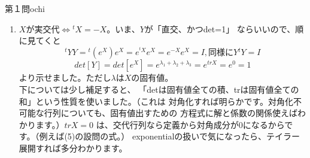 \begin{answer}{第１問}{ochi}
\begin{enumerate}
\item
  $X$が実交代$\Leftrightarrow {}^tX=-X$。いま、$Y$が「直交、かつdet=1」
  ならいいので、順に見てくと
  \begin{equation}
  {}^tYY={}^t(e^X)e^X=e^{{}^tX}e^X=e^{-X}e^X=I,　同様にY{}^tY=I
  \end{equation}
  \begin{equation}
  det[Y]=det [e^X]=e^{\lambda_1+\lambda_2+\lambda_3}=e^{tr X}=e^0=1
  \end{equation}
  より示せました。ただし$\lambda$は$X$の固有値。\\

  下については少し補足すると、
  「detは固有値全ての積、trは固有値全ての和」という性質を使いました。（これは
  対角化すれば明らかです。対角化不可能な行列についても、固有値出すための
  方程式に解と係数の関係使えばわかります。）$tr X=0$
  は、交代行列なら定義から対角成分が$0$になるからです。（例えば(5)の設問の式。）
  exponentialの扱いで気になったら、テイラー展開すれば多分わかります。
\end{enumerate}
\end{answer}

